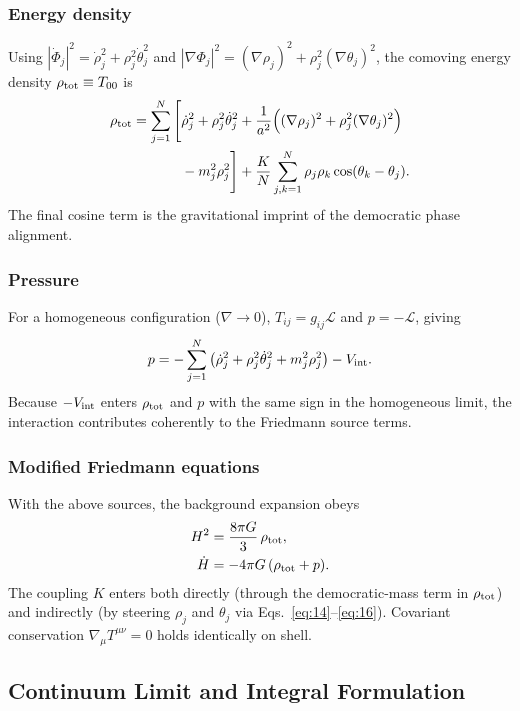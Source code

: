 \subsubsection*{Energy density}
Using $|\dot{\Phi}_j|^2=\dot{\rho}_j^2+\rho_j^2\dot{\theta}_j^2$ and $|\nabla\Phi_j|^2=(\nabla\rho_j)^2+\rho_j^2(\nabla\theta_j)^2$, the comoving energy density $\rho_{\rm tot}\equiv T_{00}$ is
\begin{equation}
{
\begin{aligned}
\rho_{\rm tot} = \sum_{j=1}^N\Bigg[
&\dot{\rho}_j^2 + \rho_j^2\dot{\theta}_j^2
+ \frac{1}{a^2}\Big((\nabla\rho_j)^2 + \rho_j^2(\nabla\theta_j)^2\Big) \\
&- m_j^2\rho_j^2 \Bigg]
+ \frac{K}{N}\sum_{j,k=1}^N\rho_j\rho_k\cos(\theta_k-\theta_j) .
\end{aligned}
}
\end{equation}
The final cosine term is the gravitational imprint of the democratic phase alignment.

\subsubsection*{Pressure}
For a homogeneous configuration ($\nabla\to0$), $T_{ij}=g_{ij}\mathcal{L}$ and $p=-\mathcal{L}$, giving
\begin{equation}
{
p = -\sum_{j=1}^N\big(\dot{\rho}_j^2 + \rho_j^2\dot{\theta}_j^2 + m_j^2\rho_j^2\big)
- V_{\rm int} .
}
\end{equation}
Because $-V_{\rm int}$ enters $\rho_{\rm tot}$ and $p$ with the same sign in the homogeneous limit, the interaction contributes coherently to the Friedmann source terms.

\subsubsection*{Modified Friedmann equations}
With the above sources, the background expansion obeys
\begin{align}
H^2 &= \frac{8\pi G}{3}\,\rho_{\rm tot}, \\
\dot{H} &= -4\pi G\,(\rho_{\rm tot}+p) .
\end{align}
The coupling $K$ enters both directly (through the democratic-mass term in $\rho_{\rm tot}$) and indirectly (by steering $\rho_j$ and $\theta_j$ via Eqs.~\eqref{eq:14}--\eqref{eq:16}). Covariant conservation $\nabla_\mu T^{\mu\nu}=0$ holds identically on shell.

\subsection{Continuum Limit and Integral Formulation}
\label{subsec:continuum}

